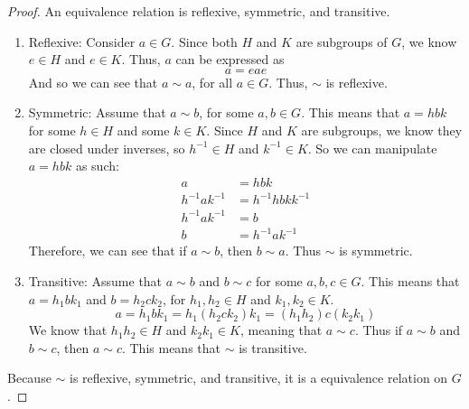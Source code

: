 \documentclass{article}
\begin{document}
\begin{proof}
    An equivalence relation is reflexive, symmetric, and transitive.
    \begin{enumerate}
        \item Reflexive: Consider $a \in G$. Since both $H$ and $K$ are subgroups of $G$, we know $e \in H$ and $e \in K$. Thus, $a$ can be expressed as
              \[
                  a = eae
              \]
              And so we can see that $a \sim a$, for all $a \in G$. Thus, $\sim$ is reflexive.
        \item Symmetric: Assume that $a \sim b$, for some $a,b \in G$. This means that $a = hbk$ for some $h \in H$ and some $k \in K$. Since $H$ and $K$ are subgroups, we know they are closed under inverses, so $h^{-1} \in H$ and $k^{-1} \in K$. So we can manipulate $a = hbk$ as such:
              \begin{align*}
                  a             & = hbk             \\
                  h^{-1}ak^{-1} & = h^{-1}hbkk^{-1} \\
                  h^{-1}ak^{-1} & = b               \\
                  b             & = h^{-1}ak^{-1}
              \end{align*}
              Therefore, we can see that if $a \sim b$, then $b \sim a$. Thus $\sim$ is symmetric.
        \item Transitive: Assume that $a \sim b$ and $b \sim c$ for some $a,b,c \in G$. This means that $a = h_1bk_1$ and $b = h_2ck_2$, for $h_1,h_2 \in H$ and $k_1,k_2 \in K$.
              \[
                  a = h_1bk_1 = h_1(h_2ck_2)k_1 = (h_1h_2)c(k_2k_1)
              \]
              We know that $h_1h_2 \in H$ and $k_2k_1 \in K$, meaning that $a \sim c$. Thus if $a \sim b$ and $b \sim c$, then $a \sim c$. This means that $\sim$ is transitive.
    \end{enumerate}
    Because $\sim$ is reflexive, symmetric, and transitive, it is a equivalence relation on $G$.
\end{proof}
\qdash
\end{document}
